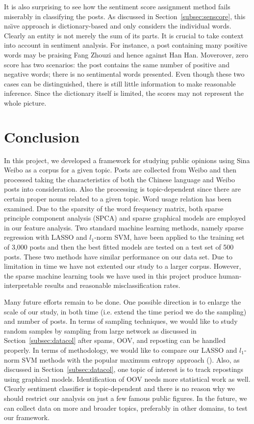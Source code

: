 \documentclass[11pt]{article}
\newcommand{\note}[1]{{\em \color{red} #1}}
\newcommand{\1}[1]{{\mathbf 1}\left\{#1\right\}}        %
\begin{document}
It is also surprising to see how the sentiment score assignment method fails miserably in classifying the posts. As discussed in Section~\ref{subsec:senscore}, this na\"\i ve approach is dictionary-based and only considers the individual words. Clearly an entity is not merely the sum of its parts. It is crucial to take context into account in sentiment analysis. For instance, a post containing many positive words may be praising Fang Zhouzi and hence against Han Han.  Moverover, zero score has two scenarios: the post contains the same number of positive  and negative words; there is no sentimental words presented. Even though these two cases can be distinguished, there is still little information to make reasonable inference. Since the dictionary itself is limited, the scores may not represent the whole picture.


\section{Conclusion}

In this project, we developed a framework for studying public opinions using Sina Weibo as a corpus for a given topic. Posts are collected from Weibo and then processed taking the characteristics of both the Chinese language and Weibo posts into consideration. Also the processing is topic-dependent since there are certain proper nouns related to a given topic.
Word usage relation has been examined. Due to the sparsity of the word frequency matrix, both sparse principle component analysis  (SPCA) and sparse graphical models are employed in our feature analysis. 
Two standard machine learning methods, namely sparse regression with LASSO and $l_1$-norm SVM, have been applied to the training set of 3,000 posts and then the best fitted models are tested on a test set of 500 posts. These two methods have similar performance on our data set. Due to limitation in time we have not extented our study to a larger corpus. However, the sparse machine learning tools we have used in this project produce human-interpretable results and reasonable misclassification rates.

Many future efforts remain to be done. One possible direction is to enlarge the scale of our study, in both time (i.e. extend the time period we do the sampling) and number of posts. In terms of sampling techniques, we would like to study random samples by sampling from large network as discussed in Section~\ref{subsec:datacol} after spams, OOV, and reposting can be handled properly. In terms of methodology, we would like to compare our LASSO and $l_1$-norm SVM methods with the popular maximum entropy approach (\cite{lee2011chinese, nigam1999using}). Also, as discussed in Section~\ref{subsec:datacol}, one topic of interest is to track repostings using graphical models. Identification of OOV needs more statistical work as well.  Clearly sentiment classifier is topic-dependent and there is no reason why we should restrict our analysis on just a few famous public figures. In the future, we can collect data on more and broader topics, preferably in other domains, to test our framework.
\clearpage
\end{document}
